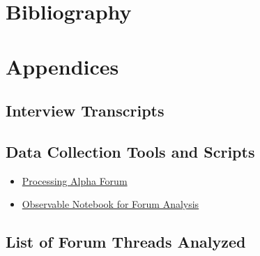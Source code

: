 \documentclass{article}
\begin{document}
\section{Bibliography}
\printbibliography

\section{Appendices}

\subsection{Interview Transcripts}


\subsection{Data Collection Tools and Scripts}

\begin{itemize}
    \item \href{https://forum.processing.org/alpha/}{Processing Alpha Forum}
    \item \href{https://observablehq.com/d/042b1cf42ea9bb5e}{Observable Notebook for Forum Analysis}
\end{itemize}


\subsection{List of Forum Threads Analyzed}
\end{document}
